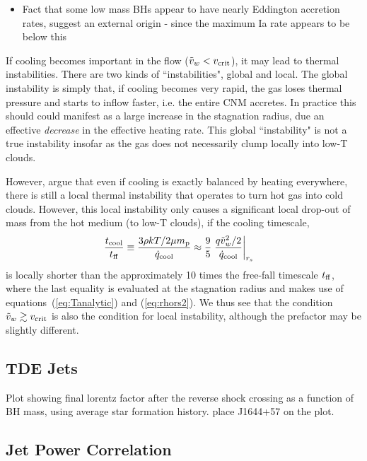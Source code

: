 \documentclass[usenatbib,fleqn]{mn2e}
\newcommand{\rs}{r_s}
\newcommand{\vw}{\tilde{v}_{w}}
\renewcommand{\mp}{m_{\rm p}}
\newcommand{\tcool}{t_{\rm cool}}
\newcommand{\tff}{t_{\rm ff}}
\begin{document}
\begin{itemize}
\item{Fact that some low mass BHs appear to have nearly Eddington accretion rates, suggest an external origin - since the maximum Ia rate appears to be below this}
\end{itemize}

If cooling becomes important in the flow ($\tilde{v}_{w} < v_{\rm crit}$), it may lead to thermal instabilities.  There are two kinds of ``instabilities", global and local.  The global instability is simply that, if cooling becomes very rapid, the gas loses thermal pressure and starts to inflow faster, i.e. the entire CNM accretes.  In
practice this should could manifest as a large increase in the stagnation radius, due an effective {\it decrease} in the effective heating rate.  This global ``instability" is not a true instability insofar as the gas does not necessarily clump locally into low-T clouds.

However, \citet{McCourt+12} argue that even if cooling is exactly
balanced by heating everywhere, there is still a local thermal
instability that operates to turn hot gas into cold clouds.  However,
this local instability only causes a significant local drop-out of
mass from the hot medium (to low-T clouds), if the cooling timescale,
\begin{align}
\frac{\tcool}{\tff} &\equiv \frac{3\rho k T/2 \mu \mp}{\dot{q}_{\rm cool}} \approx \frac{9}{5} \left. \frac{q \vw^2/2}{\dot{q}_{\rm cool}}\right|_{\rs}
\end{align} 
is locally shorter than the approximately 10 times the free-fall
timescale $t_{\rm ff}$, where the last equality is evaluated at the
stagnation radius and makes use of equations~(\ref{eq:Tanalytic}) and
(\ref{eq:rhors2}).  We thus see that the condition $\tilde{v}_{w} \gtrsim v_{\rm
  crit}$ is also the condition for local instability, although the
prefactor may be slightly different.

\subsection{TDE Jets}

Plot showing final lorentz factor after the reverse shock crossing as a function of BH mass, using average star formation history.  place J1644+57 on the plot.

\subsection{Jet Power Correlation}
\end{document}
